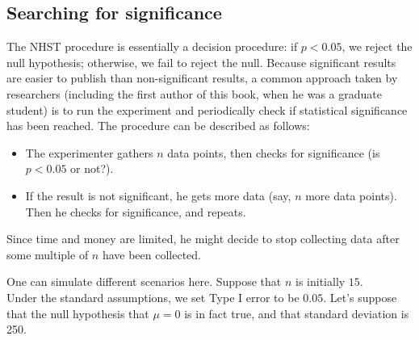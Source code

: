 \documentclass[12pt,]{krantz}
\newenvironment{Shaded}{\begin{snugshade}}{\end{snugshade}}
\newcommand{\CommentTok}[1]{\textcolor[rgb]{0.56,0.35,0.01}{\textit{#1}}}
\newcommand{\ControlFlowTok}[1]{\textcolor[rgb]{0.13,0.29,0.53}{\textbf{#1}}}
\newcommand{\DataTypeTok}[1]{\textcolor[rgb]{0.13,0.29,0.53}{#1}}
\newcommand{\DecValTok}[1]{\textcolor[rgb]{0.00,0.00,0.81}{#1}}
\newcommand{\KeywordTok}[1]{\textcolor[rgb]{0.13,0.29,0.53}{\textbf{#1}}}
\newcommand{\NormalTok}[1]{#1}
\newcommand{\OperatorTok}[1]{\textcolor[rgb]{0.81,0.36,0.00}{\textbf{#1}}}
\newcommand{\OtherTok}[1]{\textcolor[rgb]{0.56,0.35,0.01}{#1}}
\newcommand{\StringTok}[1]{\textcolor[rgb]{0.31,0.60,0.02}{#1}}
\providecommand{\tightlist}{%
  \setlength{\itemsep}{0pt}\setlength{\parskip}{0pt}}
\begin{document}
\hypertarget{searching-for-significance}{%
\subsection{Searching for significance}\label{searching-for-significance}}

The NHST procedure is essentially a decision procedure: if \(p<0.05\), we reject the null hypothesis; otherwise, we fail to reject the null. Because significant results are easier to publish than non-significant results, a common approach taken by researchers (including the first author of this book, when he was a graduate student) is to run the experiment and periodically check if statistical significance has been reached. The procedure can be described as follows:

\begin{itemize}
\tightlist
\item
  The experimenter gathers \(n\) data points, then checks for significance (is \(p<0.05\) or not?).
\item
  If the result is not significant, he gets more data (say, \(n\) more data points). Then he checks for significance, and repeats.
\end{itemize}

Since time and money are limited, he might decide to stop collecting data after some multiple of \(n\) have been collected.

One can simulate different scenarios here. Suppose that \(n\) is initially \(15\).\\
Under the standard assumptions, we set Type I error to be \(0.05\). Let's suppose that the null hypothesis that \(\mu=0\) is in fact true, and that standard deviation is 250.

\begin{Shaded}
\end{Shaded}
\end{document}
